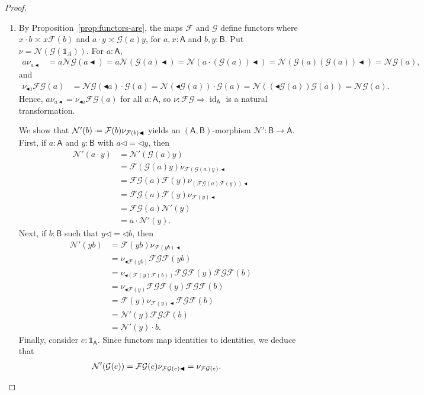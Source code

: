\documentclass{amsart}
\newcommand{\Cat}[1]{\mathsf{#1}}
\newcommand{\cat}[1]{\Cat{#1}}
\newcommand{\acat}[1]{\mathsf{#1}}
\numberwithin{lstfloat}{section}
\DeclareMathOperator{\id}{id}
\newcommand{\srcfunc}{\mathbin{\blacktriangleleft}}
\newcommand{\tgtfunc}{\mathbin{\blacktriangleleft}}
\newcommand{\src}[1]{#1\srcfunc}
\newcommand{\tgt}[1]{\tgtfunc #1}
\newcommand{\one}{\mathbb{1}}
\newcommand{\defeq}{\mathrel{\hstretch{.13}{=}\hspace{.2ex}{=}}}
\newcommand{\func}[1]{\mathcal{#1}}
\newcommand{\fF}{\func{F}}
\newcommand{\fG}{\func{G}}
\newcommand{\fN}{\func{N}}
\newcommand{\cA}{\cat{A}}
\newcommand{\cB}{\cat{B}}
\newenvironment{iprf}{\begin{enumerate}[label=(\alph*), ref=(\alph*),
      labelwidth=-18pt, leftmargin=0pt, topsep=3pt, itemsep=2pt, parsep=2pt]}
      {\end{enumerate}}
\theoremstyle{definition}
\theoremstyle{remark}
\numberwithin{equation}{section}
\begin{document}
\begin{proof}
 \begin{iprf}
\item  By Proposition~\ref{prop:functors-are}, the maps $\fF$ and $\fG$  define functors 
  where $x\cdot b\asymp x\fF(b)$ and $a\cdot y\asymp \fG(a)y$, for $a,x:\cA$ and $b,y:\cB$.
  Put $\nu=\fN(\fG(\one_A))$. For $a:\acat{A}$, 
  \begin{align*}
    a\nu_{\src{a}}
    & = a\fN\fG(\src{a})
      = a\fN(\src{\fG(a)})
      = \fN(a\cdot \src{(\fG(a))}) 
      = \fN(\fG(a)\src{(\fG(a))}) 
      = \fN\fG(a), 
  \end{align*}
  and 
  \begin{align*}
    \nu_{\tgt{a}} \fF\fG(a)
    & = \fN\fG(\tgt{a})\cdot\fG(a)
      = \fN(\tgt{\fG(a)})\cdot \fG(a) 
      = \fN((\tgt{\fG(a)})\fG(a)) 
      = \fN\fG(a).
  \end{align*}
  Hence, $a\nu_{\src{a}} = \nu_{\tgt{a}} \fF\fG(a)$ for all $a:\acat{A}$, so $\nu:\fF\fG\Rightarrow \id_{\cA}$ is a natural transformation.


  We show that $\mathcal{N}'(b) \defeq \fF(b)\nu_{\src{\fF(b)}}$ yields an
  $(\cA,\cB)$-morphism $\mathcal{N}': \cB \to \cA$. 
  First, if $a:\cA$ and $y:\cB$
  with $a\lhd = \lhd y$, then 
  \begin{align*}
    \mathcal{N}'(a\cdot y) &= \mathcal{N}'(\fG(a)y) \\
    &= \fF(\fG(a)y) \nu_{\src{\fF(\fG(a)y)}} \\
    &= \fF\fG(a)\fF(y) \nu_{\src{(\fF\fG(a)\fF(y))}} \\
    &= \fF\fG(a) \fF(y)\nu_{\src{\fF(y)}} \\
    &= \fF\fG(a) \mathcal{N}'(y) \\
    &= a\cdot \mathcal{N}'(y).
  \end{align*}
  Next, if $b:\cB$ such that $y\lhd = \lhd b$, then 
  \begin{align*}
    \mathcal{N}'(yb) &= \fF(yb)\nu_{\src{\fF(yb)}} \\
    &= \nu_{\tgt{\fF(yb)}}\fF\fG\fF(yb) \\ 
    &= \nu_{\tgt{(\fF(y)\fF(b))}}\fF\fG\fF(y)\fF\fG\fF(b) \\
    &= \nu_{\tgt{\fF(y)}}\fF\fG\fF(y)\fF\fG\fF(b) \\
    &= \fF(y)\nu_{\src{\fF(y)}}\fF\fG\fF(b) \\
    &= \mathcal{N}'(y)\fF\fG\fF(b) \\
    &= \mathcal{N}'(y) \cdot b.
  \end{align*}
  Finally, consider $e:\one_{\cA}$. Since 
  functors map identities to identities, we deduce that 
  \begin{align*}
    \mathcal{N}'(\fG(e)) &= \fF\fG(e) \nu_{\src{\fF\fG(e)}} = \nu_{\fF\fG(e)} . \qedhere
  \end{align*} 
 \end{iprf}
\end{proof}
\end{document}
